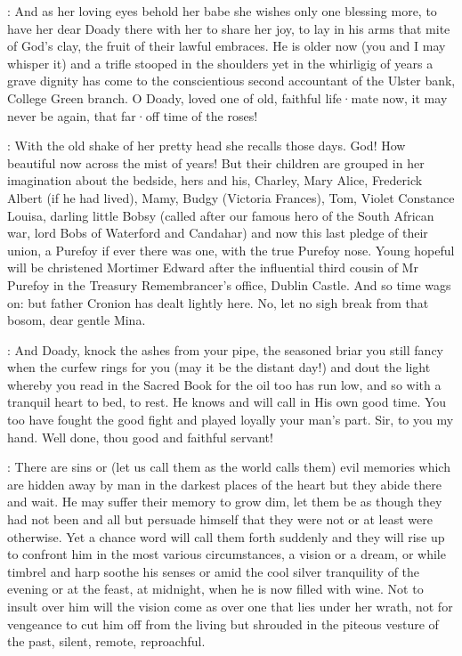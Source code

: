 :
And as her loving eyes behold her babe she wishes only one blessing more,
to have her dear Doady there with her to share her joy,
to lay in
his arms that mite of God's clay,
the fruit of their lawful embraces.
He
is older now
(you and I may whisper it)
and a trifle stooped in the shoulders yet in the whirligig of years a grave dignity has come to the conscientious second accountant of the Ulster bank,
College Green branch.
O Doady,
loved one of old,
faithful life·mate now,
it may never be again,
that far·off time of the roses!

:
With the old shake of her pretty head she recalls those days.
God!
How beautiful now across the mist of years!
But their children are grouped in her imagination about the bedside,
hers and his,
Charley,
Mary
Alice,
Frederick Albert
(if he had lived),
Mamy,
Budgy
(Victoria Frances),
Tom,
Violet Constance Louisa,
darling little Bobsy
(called after our famous hero of the South African war,
lord Bobs of Waterford and Candahar)
and now this last pledge of their union,
a Purefoy if ever there was one,
with the true Purefoy nose.
Young hopeful will be christened Mortimer Edward after the influential third cousin of Mr
Purefoy in the Treasury Remembrancer's office,
Dublin Castle.
And so time wags on:
but father Cronion has dealt lightly here.
No,
let no sigh break from that bosom,
dear gentle Mina.

:
And Doady,
knock the ashes from your pipe,
the seasoned briar you still fancy when the curfew rings for you
(may it be the distant day!)
and dout the light whereby you read in the Sacred Book for the oil too has run low,
and so with a tranquil heart to bed,
to rest.
He knows and will call in His own good time.
You too have fought the good fight and played loyally your man's part.
Sir,
to you my hand.
Well done,
thou good and faithful servant!


:
There are sins or
(let us call them as the world calls them)
evil memories which are hidden away by man in the darkest places of the heart
but they abide there and wait.
He may suffer their memory to grow dim,
let them be as though they had not been and all but persuade himself that
they were not or at least were otherwise.
Yet a chance word will call
them forth suddenly and they will rise up to confront him in the most
various circumstances,
a vision or a dream,
or while timbrel and harp
soothe his senses or amid the cool silver tranquility of the evening or
at the feast,
at midnight,
when he is now filled with wine.
Not to insult
over him will the vision come as over one that lies under her wrath,
not
for vengeance to cut him off from the living but shrouded in the piteous
vesture of the past,
silent,
remote,
reproachful.

